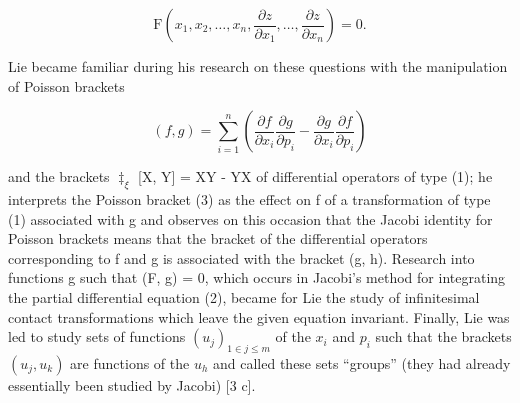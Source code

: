\[
\mathrm{F} \left(x _ {1}, x _ {2}, \dots , x _ {n}, \frac {\partial z}{\partial x _ {1}}, \dots , \frac {\partial z}{\partial x _ {n}}\right) = 0.\tag{2}
\]

Lie became familiar during his research on these questions with the manipulation of Poisson brackets

\[
(f, g) = \sum_ {i = 1} ^ {n} \left(\frac {\partial f}{\partial x _ {i}} \frac {\partial g}{\partial p _ {i}} - \frac {\partial g}{\partial x _ {i}} \frac {\partial f}{\partial p _ {i}}\right)\tag{3}
\]

and the brackets \(\ddagger_{\xi}\) {[}X, Y{]} = XY - YX of differential operators of type (1); he interprets the Poisson bracket (3) as the effect on f of a transformation of type (1) associated with g and observes on this occasion that the Jacobi identity for Poisson brackets means that the bracket of the differential operators corresponding to f and g is associated with the bracket (g, h). Research into functions g such that (F, g) = 0, which occurs in Jacobi's method for integrating the partial differential equation (2), became for Lie the study of infinitesimal contact transformations which leave the given equation invariant. Finally, Lie was led to study sets of functions \((u_{j})_{1 \in j \leq m}\) of the \(x_{i}\) and \(p_{i}\) such that the brackets \((u_{j}, u_{k})\) are functions of the \(u_{h}\) and called these sets ``groups'' (they had already essentially been studied by Jacobi) {[}3 c{]}.

